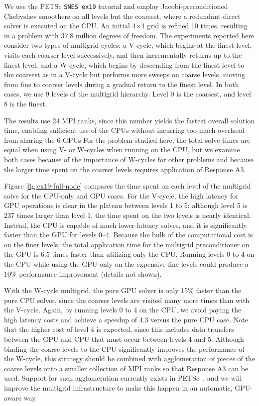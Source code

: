 \documentclass[10pt,journal,compsoc]{IEEEtran}
\begin{document}
We use the PETSc {\tt SNES ex19} tutorial and employ
Jacobi-preconditioned Chebyshev smoothers on all levels but the coarsest,
where a redundant direct solver is executed on the CPU.
An initial 4$\times$4 grid is refined 10 times, resulting in a problem with 37.8 million 
degrees of freedom.
The experiments reported here consider two types of multigrid cycles:
a V-cycle, which begins at the finest level, visits each coarser level
successively, and then incrementally returns up to the finest level, and a
W-cycle, which begins by descending from the finest level to the coarsest as in a V-cycle but
performs more sweeps on coarse levels, moving from fine to coarser
levels during a gradual return to the finest level. In both cases, we use 9 levels of the multigrid hierarchy. 
Level 0 is the coarsest, and level 8 is the finest.

The results use 24 MPI ranks, since this number yields the fastest overall solution time,
enabling sufficient use of the CPUs without incurring too much overhead
from sharing the 6 GPUs %
For the problem studied here, the total solve times are equal when using V- or
W-cycles when running on the CPU, but we examine both cases because of the
importance of W-cycles for other problems and because the larger 
time spent on the coarser levels requires application of Response A3.

Figure \ref{fig:ex19-full-node} compares the time spent on each level of the
multigrid solve for the CPU-only and GPU cases. 
For the V-cycle, the high latency for GPU operations is clear in
the plateau between levels 1 to 5;
although level 5 is 237 times larger than level 1, the time spent
on the two levels is nearly identical.
Instead, the CPU is capable of much lower-latency solves, and it is
significantly faster than the GPU for levels 0--4.
Because the bulk of the computational cost is on the finer levels,
the total application time for the multigrid preconditioner on the GPU 
is 6.5 times faster than utilizing only the CPU.
Running levels
0 to 4 on the CPU while using the GPU only
on the expensive fine levels could produce a 10\% performance improvement (details not shown).

With the W-cycle multigrid, the pure GPU solver is only 15\% faster than the pure CPU solver,
since the coarser levels are visited many more times than with the V-cycle.
Again, by running levels 0 to 4 on the CPU, we avoid paying the high latency costs
and achieve a speedup of 4.3 versus the pure CPU case.
Note that the higher cost of level 4 is expected, since this includes
data transfers between the GPU and CPU that must occur between levels 4 and 5.
Although binding the coarse levels to the CPU significantly improves the performance of
the W-cycle, this strategy should be combined with agglomeration of pieces of the
coarse levels onto a smaller collection of MPI ranks so that Response A3 can be used.
Support for such agglomeration currently exists in PETSc~\cite{PCTELESCOPE}, and we will improve the
multigrid infrastructure to make this happen in an automatic, GPU-aware way.
\end{document}
